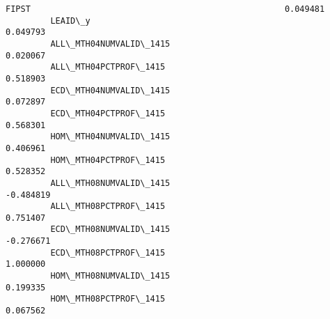 \documentclass[11pt]{article}
\begin{document}
\begin{Verbatim}[commandchars=\\\{\}]
         FIPST                                                   0.049481   
         LEAID\_y                                                 0.049793   
         ALL\_MTH04NUMVALID\_1415                                  0.020067   
         ALL\_MTH04PCTPROF\_1415                                   0.518903   
         ECD\_MTH04NUMVALID\_1415                                  0.072897   
         ECD\_MTH04PCTPROF\_1415                                   0.568301   
         HOM\_MTH04NUMVALID\_1415                                  0.406961   
         HOM\_MTH04PCTPROF\_1415                                   0.528352   
         ALL\_MTH08NUMVALID\_1415                                 -0.484819   
         ALL\_MTH08PCTPROF\_1415                                   0.751407   
         ECD\_MTH08NUMVALID\_1415                                 -0.276671   
         ECD\_MTH08PCTPROF\_1415                                   1.000000   
         HOM\_MTH08NUMVALID\_1415                                  0.199335   
         HOM\_MTH08PCTPROF\_1415                                   0.067562   
         

\end{Verbatim}
\end{document}
